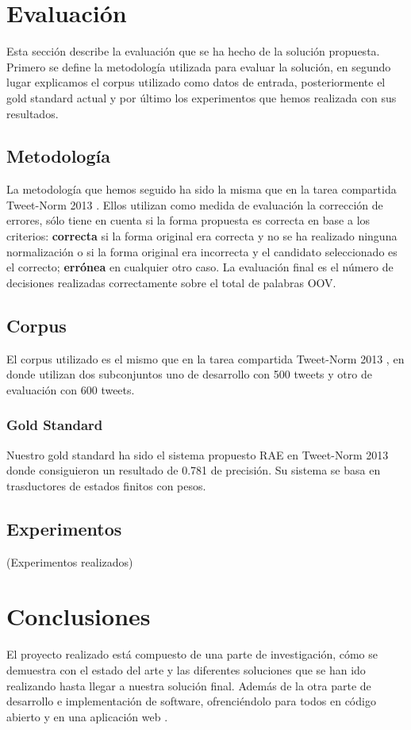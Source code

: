 \documentclass[spanish,12pt, a4paper,twoside]{paper}
\let\oldsection\section
\def\section{\cleardoublepage\oldsection}
\begin{document}
\section{Evaluación}\label{sec:evaluacion}
Esta sección describe la evaluación que se ha hecho de la solución propuesta. Primero se define la metodología utilizada para evaluar la solución, en segundo lugar explicamos el corpus utilizado como datos de entrada, posteriormente el gold standard actual y por último los experimentos que hemos realizada con sus resultados.
\subsection{Metodología}\label{sec:metodologia}
La metodología que hemos seguido ha sido la misma que en la tarea compartida Tweet-Norm 2013 \cite{tweetnorm}. Ellos utilizan como medida de evaluación la corrección de errores, sólo tiene en cuenta si la forma propuesta es correcta en base a los criterios: \textbf{correcta} si la forma original era correcta y no se ha realizado ninguna normalización o si la forma original era incorrecta y el candidato seleccionado es el correcto; \textbf{errónea} en cualquier otro caso. La evaluación final es el número de decisiones realizadas correctamente sobre el total de palabras OOV.

\subsection{Corpus}\label{sec:corpus}
El corpus utilizado es el mismo que en la tarea compartida Tweet-Norm 2013 \cite{tweetnorm}, en donde utilizan dos subconjuntos uno de desarrollo con 500 tweets y otro de evaluación con 600 tweets.

\subsubsection{Gold Standard}\label{sec:goldstandard}
Nuestro gold standard ha sido el sistema propuesto RAE \cite{porta:2013} en Tweet-Norm 2013 \cite{tweetnorm} donde consiguieron un resultado de 0.781 de precisión. Su sistema se basa en trasductores de estados finitos con pesos. 

\subsection{Experimentos}\label{sec:experimentos}
(Experimentos realizados)

\section{Conclusiones}\label{sec:conclusiones}
El proyecto realizado está compuesto de una parte de investigación, cómo se demuestra con el estado del arte y las diferentes soluciones que se han ido realizando hasta llegar a nuestra solución final. Además de la otra parte de desarrollo e implementación de software, ofrenciéndolo para todos en código abierto y en una aplicación web \cite{tweetscweb}.\\
\end{document}
